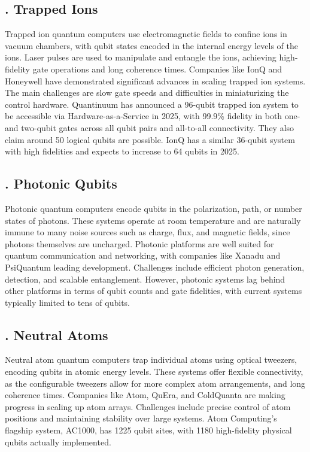 \documentclass{elbioimp2}
\begin{document}
\subsection{. Trapped Ions}

Trapped ion quantum computers use electromagnetic fields to confine ions in vacuum chambers, with qubit states encoded in the internal energy levels of the ions. Laser pulses are used to manipulate and entangle the ions, achieving high-fidelity gate operations and long coherence times. Companies like IonQ and Honeywell have demonstrated significant advances in scaling trapped ion systems. The main challenges are slow gate speeds and difficulties in miniaturizing the control hardware. Quantinuum has announced a 96-qubit trapped ion system to be accessible via Hardware-as-a-Service in 2025\cite{quantinuum2025}, with 99.9\% fidelity in both one- and two-qubit gates across all qubit pairs and all-to-all connectivity. They also claim around 50 logical qubits are possible. IonQ has a similar 36-qubit system with high fidelities and expects to increase to 64 qubits in 2025\cite{IonQ2025}.

\subsection{. Photonic Qubits}

Photonic quantum computers encode qubits in the polarization, path, or number states of photons. These systems operate at room temperature and are naturally immune to many noise sources such as charge, flux, and magnetic fields, since photons themselves are uncharged. Photonic platforms are well suited for quantum communication and networking, with companies like Xanadu and PsiQuantum leading development. Challenges include efficient photon generation, detection, and scalable entanglement. However, photonic systems lag behind other platforms in terms of qubit counts and gate fidelities, with current systems typically limited to tens of qubits.

\subsection{. Neutral Atoms}

Neutral atom quantum computers trap individual atoms using optical tweezers, encoding qubits in atomic energy levels. These systems offer flexible connectivity, as the configurable tweezers allow for more complex atom arrangements, and long coherence times. Companies like Atom, QuEra, and ColdQuanta are making progress in scaling up atom arrays. Challenges include precise control of atom positions and maintaining stability over large systems. Atom Computing's flagship system, AC1000, has 1225 qubit sites, with 1180 high-fidelity physical qubits actually implemented\cite{atom2023}.
\end{document}
